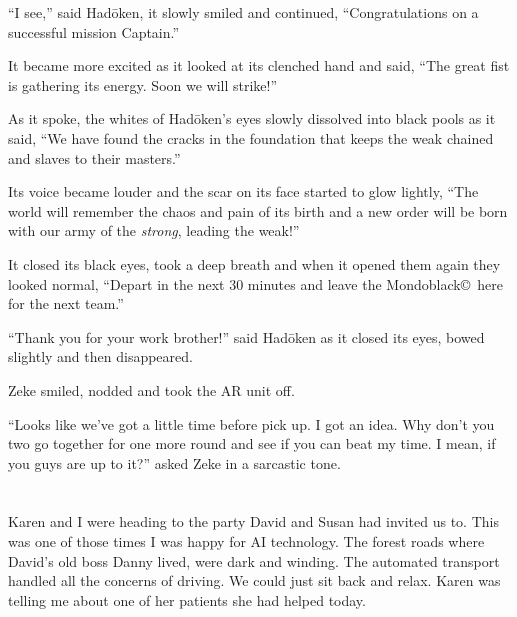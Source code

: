 ``I see,'' said Had\={o}ken, it slowly smiled and continued,
``Congratulations on a successful mission Captain.''

It became more excited as it looked at its clenched hand and
said, ``The great fist is gathering its energy. Soon we will
strike!''

As it spoke, the whites of Had\={o}ken's eyes slowly dissolved
into black pools as it said, ``We have found the cracks in the
foundation that keeps the weak chained and slaves to their
masters.''

Its voice became louder and the scar on its face started to
glow lightly, ``The world will remember the chaos and pain of
its birth and a new order will be born with our army of the
\emph{strong}, leading the weak!''

It closed its black eyes, took a deep breath and when it opened
them again they looked normal, ``Depart in the next 30 minutes
and leave the Mondoblack\copyright\ here for the next team.''

``Thank you for your work brother!'' said Had\={o}ken as it closed
its eyes, bowed slightly and then disappeared.

Zeke smiled, nodded and took the AR unit off.

``Looks like we've got a little time before pick up.  I got an
idea. Why don't you two go together for one more round and see
if you can beat my time. I mean, if you guys are up to it?''
asked Zeke in a sarcastic tone.


\section{}


Karen and I were heading to the party David and Susan had
invited us to. This was one of those times I was happy for AI
technology. The forest roads where David's old boss Danny lived,
were dark and winding. The automated transport handled all the
concerns of driving. We could just sit back and relax. Karen was
telling me about one of her patients she had helped today.

